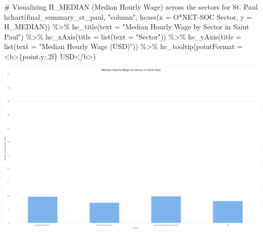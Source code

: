 \documentclass[
  letterpaper,
  DIV=11,
  numbers=noendperiod]{scrartcl}
\newenvironment{Shaded}{\begin{snugshade}}{\end{snugshade}}
\newcommand{\AttributeTok}[1]{\textcolor[rgb]{0.40,0.45,0.13}{#1}}
\newcommand{\CommentTok}[1]{\textcolor[rgb]{0.37,0.37,0.37}{#1}}
\newcommand{\FunctionTok}[1]{\textcolor[rgb]{0.28,0.35,0.67}{#1}}
\newcommand{\NormalTok}[1]{\textcolor[rgb]{0.00,0.23,0.31}{#1}}
\newcommand{\SpecialCharTok}[1]{\textcolor[rgb]{0.37,0.37,0.37}{#1}}
\newcommand{\StringTok}[1]{\textcolor[rgb]{0.13,0.47,0.30}{#1}}
\begin{document}
\begin{Shaded}
\begin{Highlighting}[]
\CommentTok{\# Visualizing H\_MEDIAN (Median Hourly Wage) across the sectors for St. Paul}
\FunctionTok{hchart}\NormalTok{(final\_summary\_st\_paul, }\StringTok{"column"}\NormalTok{, }\FunctionTok{hcaes}\NormalTok{(}\AttributeTok{x =} \StringTok{\textasciigrave{}}\AttributeTok{O*NET{-}SOC Sector}\StringTok{\textasciigrave{}}\NormalTok{, }\AttributeTok{y =}\NormalTok{ H\_MEDIAN)) }\SpecialCharTok{\%\textgreater{}\%}
  \FunctionTok{hc\_title}\NormalTok{(}\AttributeTok{text =} \StringTok{"Median Hourly Wage by Sector in Saint Paul"}\NormalTok{) }\SpecialCharTok{\%\textgreater{}\%}
  \FunctionTok{hc\_xAxis}\NormalTok{(}\AttributeTok{title =} \FunctionTok{list}\NormalTok{(}\AttributeTok{text =} \StringTok{"Sector"}\NormalTok{)) }\SpecialCharTok{\%\textgreater{}\%}
  \FunctionTok{hc\_yAxis}\NormalTok{(}\AttributeTok{title =} \FunctionTok{list}\NormalTok{(}\AttributeTok{text =} \StringTok{"Median Hourly Wage (USD)"}\NormalTok{)) }\SpecialCharTok{\%\textgreater{}\%}
  \FunctionTok{hc\_tooltip}\NormalTok{(}\AttributeTok{pointFormat =} \StringTok{\textquotesingle{}\textless{}b\textgreater{}\{point.y:.2f\} USD\textless{}/b\textgreater{}\textquotesingle{}}\NormalTok{)}
\end{Highlighting}
\end{Shaded}

\includegraphics{index_files/figure-pdf/unnamed-chunk-21-5.pdf}
\end{document}
